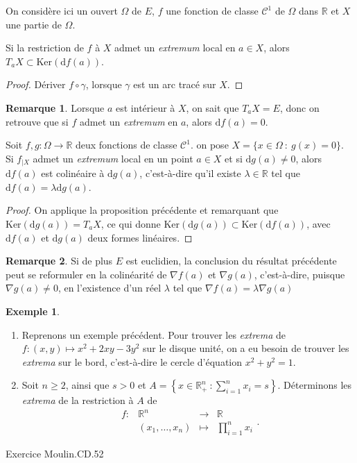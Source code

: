 \documentclass[french]{article}
\newcommand{\R}{\mathbb{R}}
\renewcommand{\ker}{\text{Ker}}
\renewcommand{\d}{\text{d}}
\theoremstyle{plain}
\theoremstyle{definition}
\newtheorem*{ex}{Exemple}
\newtheorem*{rmq}{Remarque}
\theoremstyle{remark}
\begin{document}
On considère ici un ouvert $\Omega$ de $E$, $f$ une fonction de classe $\mathcal{C}^1$ de $\Omega$ dans $\R$ et $X$ une partie de $\Omega$.

\begin{prop}%
	Si la restriction de $f$ à $X$ admet un \textit{extremum} local en $a\in X$, alors $T_aX\subset\ker(\d f(a))$.
\end{prop}
\begin{proof}
	Dériver $f\circ\gamma$, lorsque $\gamma$ est un arc tracé sur $X$.
\end{proof}

\begin{rmq}
	Lorsque $a$ est intérieur à $X$, on sait que $T_aX=E$, donc on retrouve que si $f$ admet un \textit{extremum} en $a$, alors $\d f(a)=0$.
\end{rmq}

\begin{thm}%
	Soit $f,g:\Omega\to\R$ deux fonctions de classe $\mathcal{C}^1$. on pose $X=\{x\in\Omega\ :\ g(x)=0\}$.\\
	Si $f_{\mid X}$ admet un \textit{extremum} local en un point $a\in X$ et si $\d g(a)\ne 0$, alors $\d f(a)$ est colinéaire à $\d g(a)$, c'est-à-dire qu'il existe $\lambda\in\R$ tel que $\d f(a)=\lambda\d g(a)$.
\end{thm}
\begin{proof}
	On applique la proposition précédente et remarquant que $\ker(\d g(a))=T_aX$, ce qui donne $\ker(\d g(a))\subset\ker(\d f(a))$, avec $\d f(a)$ et $\d g(a)$ deux formes linéaires.
\end{proof}

\begin{rmq}
	Si de plus $E$ est euclidien, la conclusion du résultat précédente peut se reformuler en la colinéarité de $\nabla f(a)$ et $\nabla g(a)$, c'est-à-dire, puisque $\nabla g(a)\ne 0$, en l'existence d'un réel $\lambda$ tel que $\nabla f(a)=\lambda\nabla g(a)$
\end{rmq}

\begin{ex}
	\begin{enumerate}
		\item Reprenons un exemple précédent. Pour trouver les \textit{extrema} de $f:(x,y)\mapsto x^2+2xy-3y^2$ sur le disque unité, on a eu besoin de trouver les \textit{extrema} sur le bord, c'est-à-dire le cercle d'équation $x^2+y^2=1$.
		\item Soit $n\geqslant 2$, ainsi que $s>0$ et $A=\displaystyle\left\{x\in\R_+^n\ :\sum_{i=1}^{n}x_i=s\right\}$. Déterminons les \textit{extrema} de la restriction à $A$ de $$\begin{array}{lrcl}
			f:&\R^n&\longrightarrow&\R\\
			&(x_1,\ldots,x_n)&\longmapsto&\displaystyle\prod_{i=1}^{n}x_i
		\end{array}.$$
	\end{enumerate}
\end{ex}

Exercice Moulin.CD.52
\end{document}
